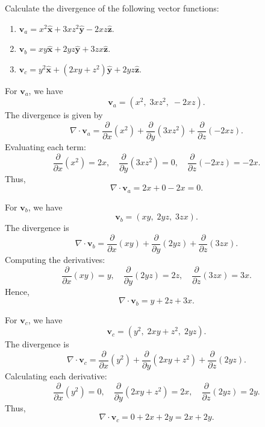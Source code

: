 \begin{hwkProblem}{1.15}{}

	Calculate the divergence of the following vector functions:
	\begin{enumerate}
		\item \( \mathbf{v}_a = x^2 \hat{\mathbf{x}} + 3 x z^2 \hat{\mathbf{y}} - 2 x z \hat{\mathbf{z}} \).
		\item \( \mathbf{v}_b = x y \hat{\mathbf{x}} + 2 y z \hat{\mathbf{y}} + 3 z x \hat{\mathbf{z}} \).
		\item \( \mathbf{v}_c = y^2 \hat{\mathbf{x}} + \left(2 x y + z^2\right) \hat{\mathbf{y}} + 2 y z \hat{\mathbf{z}} \).
	\end{enumerate}

	\hwkSol

	\hwkPart

	For \( \mathbf{v}_a \), we have 
	\[
		\mathbf{v}_a = \left( x^2,\; 3xz^2,\; -2xz \right).
	\]
	The divergence is given by
	\[
		\nabla \cdot \mathbf{v}_a = \frac{\partial}{\partial x}(x^2) + \frac{\partial}{\partial y}(3xz^2) + \frac{\partial}{\partial z}(-2xz).
	\]
	Evaluating each term:
	\[
		\frac{\partial}{\partial x}(x^2) = 2x,\quad \frac{\partial}{\partial y}(3xz^2) = 0,\quad \frac{\partial}{\partial z}(-2xz) = -2x.
	\]
	Thus,
	\[
		\nabla \cdot \mathbf{v}_a = 2x + 0 - 2x = 0.
	\]

	\hwkPart

	For \( \mathbf{v}_b \), we have 
	\[
		\mathbf{v}_b = \left( xy,\; 2yz,\; 3zx \right).
	\]
	The divergence is
	\[
		\nabla \cdot \mathbf{v}_b = \frac{\partial}{\partial x}(xy) + \frac{\partial}{\partial y}(2yz) + \frac{\partial}{\partial z}(3zx).
	\]
	Computing the derivatives:
	\[
		\frac{\partial}{\partial x}(xy) = y,\quad \frac{\partial}{\partial y}(2yz) = 2z,\quad \frac{\partial}{\partial z}(3zx) = 3x.
	\]
	Hence,
	\[
		\nabla \cdot \mathbf{v}_b = y + 2z + 3x.
	\]

	\hwkPart

	For \( \mathbf{v}_c \), we have 
	\[
		\mathbf{v}_c = \left( y^2,\; 2xy+z^2,\; 2yz \right).
	\]
	The divergence is
	\[
		\nabla \cdot \mathbf{v}_c = \frac{\partial}{\partial x}(y^2) + \frac{\partial}{\partial y}(2xy+z^2) + \frac{\partial}{\partial z}(2yz).
	\]
	Calculating each derivative:
	\[
		\frac{\partial}{\partial x}(y^2) = 0,\quad \frac{\partial}{\partial y}(2xy+z^2) = 2x,\quad \frac{\partial}{\partial z}(2yz) = 2y.
	\]
	Thus,
	\[
		\nabla \cdot \mathbf{v}_c = 0 + 2x + 2y = 2x + 2y.
	\]

\end{hwkProblem}

